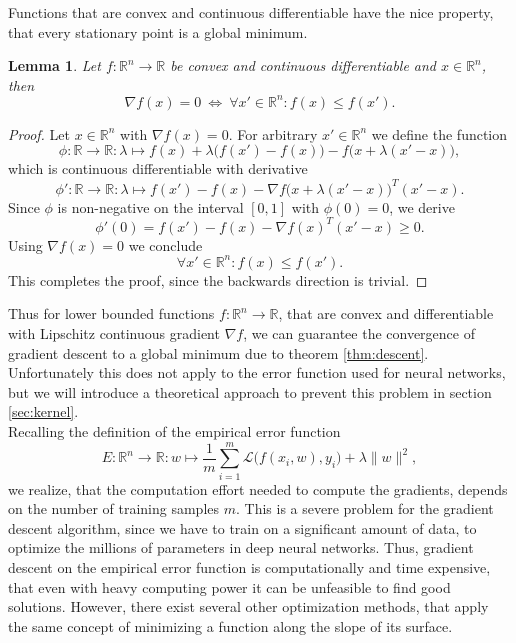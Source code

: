 \documentclass[11pt, a4paper]{article}
\newtheorem{lemma}[theorem]{Lemma}
\newcommand{\R}{\mathds{R}}
\renewcommand{\L}{\mathcal{L}}
\begin{document}
Functions that are convex and continuous differentiable have the nice property, that every stationary point is a global minimum.

\begin{lemma}
Let $f: \R^n \to \R$ be convex and continuous differentiable and $x \in \R^n$, then
\[ \nabla f(x) = 0 \ \Leftrightarrow \ \forall x' \in \R^n : f(x) \leq f(x').  \]
\end{lemma}

\begin{proof}
Let $x \in \R^n$ with $\nabla f(x) = 0$. For arbitrary $x' \in \R^n$ we define the function
\[ \phi : \R \to \R : \lambda \mapsto f(x) + \lambda \big ( f(x') - f(x) \big ) - f \big ( x + \lambda (x'-x) \big ), \]
which is continuous differentiable with derivative
\[ \phi' : \R \to \R : \lambda \mapsto f(x') - f(x) - \nabla f \big (x + \lambda(x'-x)\big )^T (x'-x). \]
Since $\phi$ is non-negative on the interval $[0,1]$ with $\phi(0) = 0$, we derive
\[ \phi'(0) = f(x') - f(x) - \nabla f(x)^T (x'-x) \geq 0. \]
Using $\nabla f(x) = 0$ we conclude
\[ \forall x' \in \R^n : f(x) \leq f(x'). \]
This completes the proof, since the backwards direction is trivial.
\end{proof}

Thus for lower bounded functions $f: \R^n \to \R$, that are convex and differentiable with Lipschitz continuous gradient $\nabla f$, we can guarantee the convergence of gradient descent to a global minimum due to theorem \ref{thm:descent}. Unfortunately this does not apply to the error function used for neural networks, but we will introduce a theoretical approach to prevent this problem in section \ref{sec:kernel}. \\

Recalling the definition of the empirical error function 
 \[ E : \R^n \to \R : w \mapsto \frac{1}{m} \sum_{i=1}^{m} \L \big ( f(x_i,w),y_i \big) + \lambda \| w \|^2, \]
we realize, that the computation effort needed to compute the gradients, depends on the number of training samples $m$. This is a severe problem for the gradient descent algorithm, since we have to train on a significant amount of data, to optimize the millions of parameters in deep neural networks. Thus, gradient descent on the empirical error function is computationally and time expensive, that even with heavy computing power it can be unfeasible to find good solutions. However, there exist several other optimization methods, that apply the same concept of minimizing a function along the slope of its surface. \\
\end{document}
